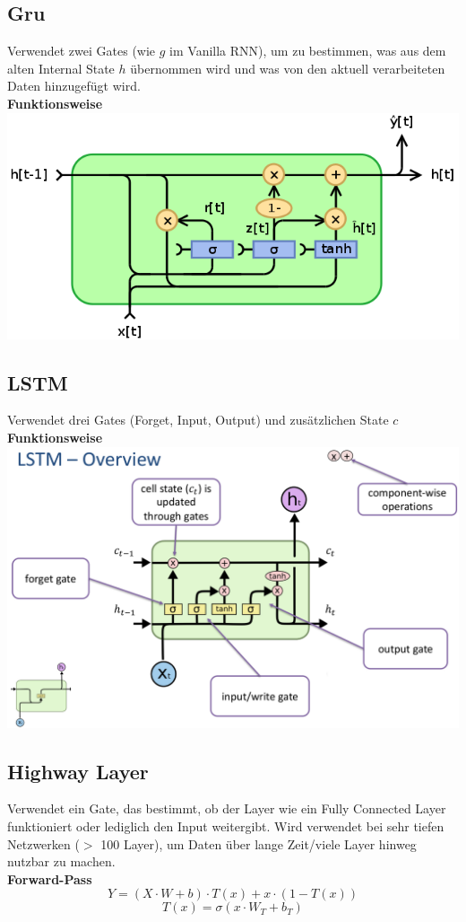 \documentclass[12pt]{article}
\begin{document}
	\subsection{Gru}
	Verwendet zwei Gates (wie $g$ im Vanilla RNN), um zu bestimmen, was aus dem alten Internal State $h$ übernommen wird und was von den aktuell verarbeiteten Daten hinzugefügt wird.\\
	\textbf{Funktionsweise}\\
	\includegraphics[width=\linewidth]{figures/gru.png}
	\subsection{LSTM}
	Verwendet drei Gates (Forget, Input, Output) und zusätzlichen State $c$\\
	\textbf{Funktionsweise}\\
	\includegraphics[width=\linewidth]{figures/lstm.png}
	\subsection{Highway Layer}
	Verwendet ein Gate, das bestimmt, ob der Layer wie ein Fully Connected Layer funktioniert oder lediglich den Input weitergibt. Wird verwendet bei sehr tiefen Netzwerken ($>$ 100 Layer), um Daten über lange Zeit/viele Layer hinweg nutzbar zu machen.\\
	\textbf{Forward-Pass}
	$$Y = (X \cdot W + b) \cdot T(x) + x \cdot (1 - T(x))$$
	$$T(x) = \sigma(x \cdot W_T + b_T)$$
\end{document}
